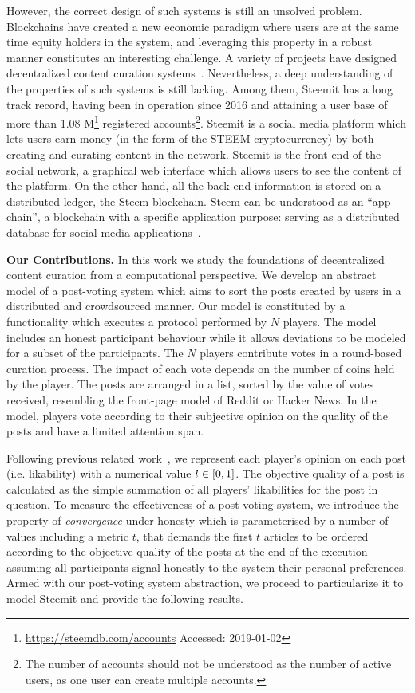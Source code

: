    However, the correct design of such systems is still an unsolved problem. Blockchains have created a new economic paradigm where users are at the same time equity holders in the system, and leveraging this property in a robust manner constitutes an interesting challenge.
   A variety of projects have designed decentralized content curation systems~\cite{synereo,steemit,tcr}. Nevertheless, a deep understanding of the properties of such systems is still lacking. Among them, Steemit
has a long track record, having been in operation since 2016 and attaining a user base of more than 1.08 M\footnote{\url{https://steemdb.com/accounts} Accessed: 2019-01-02} registered accounts\footnote{The number of accounts should not be understood as the number of active users, as one user can create multiple accounts.}. Steemit is a social media platform which lets users earn money (in the form of the STEEM cryptocurrency) by both creating and curating content in the network. Steemit is the front-end of the social network, a graphical web interface which allows users to see the content of the platform. On the other hand, all the back-end information is stored on a distributed ledger, the Steem blockchain. Steem can be understood as an ``app-chain'', a blockchain with a specific application purpose: serving as a distributed database for social media applications~\cite{steemit}.

\noindent  \textbf{Our Contributions.}
In this work we study the foundations of decentralized content curation from a computational perspective. We develop an abstract model of a post-voting system which aims to sort the posts created by users in a distributed and crowdsourced manner.
  Our model is constituted by a functionality which executes a protocol performed by $N$ players. The model includes an honest participant behaviour while it allows deviations to be modeled for a subset of the participants.      The $N$ players contribute votes in a round-based curation process. The impact of each vote depends on the number of coins held by the player.
   The posts are arranged in a list, sorted by the value of votes received, resembling the front-page model of Reddit or Hacker News. In the model, players vote according to their subjective opinion on the quality of the posts and have a limited attention span.

   Following previous related work~\cite{ghosh2011incentivizing,askalidis2013theoretical}, we represent each player's opinion on each post (i.e. likability) with a numerical value $l \in [ 0,1 ]$.
   The objective quality of a post is calculated as the simple summation of all players' likabilities for the post in question. 
   To measure the effectiveness of a post-voting system, we introduce the property of  \textit{convergence} under honesty which is parameterised by a number of values including a metric $t$, that demands the  first $t$ articles to be   ordered according to the objective quality of the posts at the end of the execution assuming all participants signal honestly to the system their personal preferences. 
Armed with our  post-voting system abstraction, we proceed to particularize it to model Steemit and provide the following results. 

